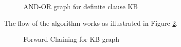 \documentclass[10pt,a4paper]{article}
\begin{document}
\begin{figure}[t]
\centering
{}
\caption{AND-OR graph for definite clause KB}
\label{fig:forward_graph_1}
\end{figure}
The flow of the algorithm works as illustrated in Figure \ref{fig:forward_graph_2}.


\begin{figure}[H]
\centering
{}
\caption{Forward Chaining for KB graph}
\label{fig:forward_graph_2}
\end{figure}
\end{document}
